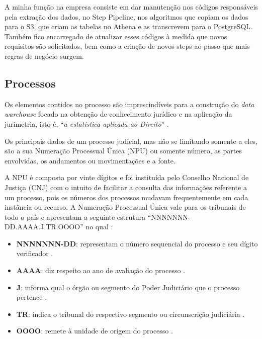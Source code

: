A minha função na empresa consiste em dar manutenção nos códigos responsáveis pela extração dos dados, no Step Pipeline, nos algoritmos que copiam os dados para o S3, que criam as tabelas no Athena e as transcrevem para o PostgreSQL. Também fico encarregado de atualizar esses códigos à medida que novos requisitos são solicitados, bem como a criação de novos steps ao passo que mais regras de negócio surgem.


\subsection{Processos}
\label{subsec:processos}

Os elementos contidos no processo são imprescindíveis para a construção do \textit{data warehouse} focado na obtenção de conhecimento jurídico e na aplicação da jurimetria, isto é, \enquote{\textit{a estatística aplicada ao Direito}} \cite{newlawJurimetria}.

Os principais dados de um processo judicial, mas não se limitando somente a eles, são a sua Numeração Processual Única (NPU) ou somente número, as partes envolvidas, os andamentos ou movimentações e a fonte.

A NPU é composta por vinte dígitos e foi instituída pelo Conselho Nacional de Justiça (CNJ) com o intuito de facilitar a consulta das informações referente a um processo, pois os números dos processos mudavam frequentemente em cada instância ou recurso. A Numeração Processual Única vale para os tribunais de todo o país e apresentam a seguinte estrutura \enquote{NNNNNNN-DD.AAAA.J.TR.OOOO} no qual \cite{jusbrasilNPU}:

\begin{itemize}
    \item \textbf{NNNNNNN-DD}: representam o número sequencial do processo e seu dígito verificador \cite{TRF4NPU}.
    \item \textbf{AAAA}: diz respeito ao ano de avaliação do processo \cite{TRF4NPU}.
    \item \textbf{J}: informa qual o órgão ou segmento do Poder Judiciário que o processo pertence \cite{TRF4NPU}.
    \item \textbf{TR}: indica o tribunal do respectivo segmento ou circunscrição judiciária \cite{TRF4NPU}.
    \item \textbf{OOOO}: remete à unidade de origem do processo \cite{TRF4NPU}.
\end{itemize}

